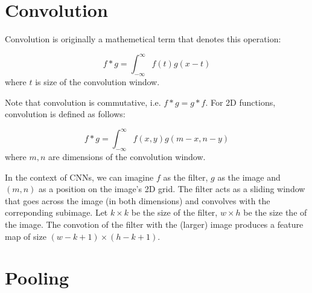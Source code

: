 \documentclass[11pt,letterpaper]{article}
\begin{document}
\section{Convolution}

Convolution is originally a mathemetical term that denotes this operation:

\begin{equation}
  f * g = \int_{-\infty}^{\infty} f(t)g(x - t)
\end{equation} where $t$ is size of the convolution window.  

Note that convolution is commutative, i.e. $f * g = g * f$. For 2D functions, convolution is defined as follows:

\begin{equation}
  f * g = \int_{-\infty}^{\infty} f(x, y) g(m - x, n - y)
\end{equation} where $m, n$ are dimensions of the convolution window. 

In the context of CNNs, we can imagine $f$ as the filter, $g$ as the image and $(m, n)$ as a position on the image's 2D grid. The filter acts as a sliding window that goes across the image (in both dimensions) and convolves with the correponding subimage. Let $k\times k$ be the size of the filter, $w \times h$ be the size the of the image. The convotion of the filter with the (larger) image produces a feature map of size $(w - k + 1)\times(h - k + 1)$.

\section{Pooling}
\end{document}
